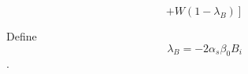 \begin{equation}
\left.+W\left(1-\lambda_{B}\right)\right]
\end{equation}

Define 
\begin{equation}
\lambda_{B}=-2 \alpha_{s} \beta_{0} B_{i}
\end{equation}.







